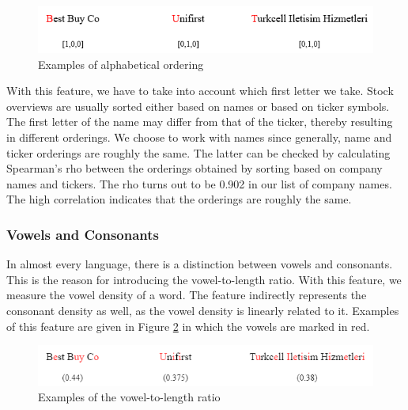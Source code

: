 \documentclass[11pt]{article}
\begin{document}
\vspace{0.5cm}
\begin{figure}[h]
    \centering
    \includegraphics[scale=0.6]{figures/alphabet_order.png}
    \caption{Examples of alphabetical ordering}
    \label{fig:alphabeticalorder}
\end{figure}
\vspace{0.5cm}

\noindent

With this feature, we have to take into account which first letter we take. Stock overviews are usually sorted either based on names or based on ticker symbols. The first letter of the name may differ from that of the ticker, thereby resulting in different orderings. We choose to work with names since generally, name and ticker orderings are roughly the same. The latter can be checked by calculating Spearman's rho between the orderings obtained by sorting based on company names and tickers. The rho turns out to be 0.902 in our list of company names. The high correlation indicates that the orderings are roughly the same.


\subsubsection{Vowels and Consonants}
In almost every language, there is a distinction between vowels and consonants. This is the reason for introducing the vowel-to-length ratio. With this feature, we measure the vowel density of a word. The feature indirectly represents the consonant density as well, as the vowel density is linearly related to it. Examples of this feature are given in Figure \ref{fig:voweltolength} in which the vowels are marked in red.

\vspace{0.5cm}
\begin{figure}[h]
    \centering
    \includegraphics[scale=0.6]{figures/vowel_density.png}
    \caption{Examples of the vowel-to-length ratio}
    \label{fig:voweltolength}
\end{figure}
\vspace{0.5cm}
\end{document}
